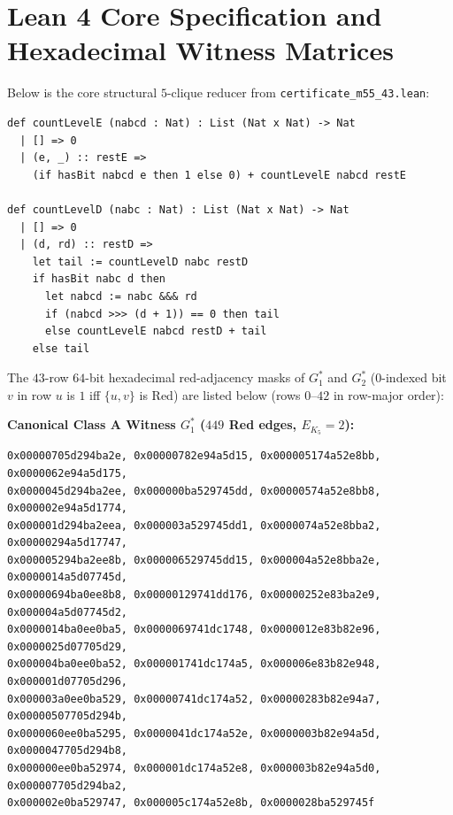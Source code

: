 \documentclass[11pt,a4paper]{article}
\theoremstyle{plain}
\theoremstyle{definition}
\begin{document}
\appendix
\section{Lean 4 Core Specification and Hexadecimal Witness Matrices}
\label{app:lean4}

Below is the core structural $5$-clique reducer from \texttt{certificate\_\allowbreak m55\_\allowbreak 43.lean}:
{\small
\begin{verbatim}
def countLevelE (nabcd : Nat) : List (Nat x Nat) -> Nat
  | [] => 0
  | (e, _) :: restE =>
    (if hasBit nabcd e then 1 else 0) + countLevelE nabcd restE

def countLevelD (nabc : Nat) : List (Nat x Nat) -> Nat
  | [] => 0
  | (d, rd) :: restD =>
    let tail := countLevelD nabc restD
    if hasBit nabc d then
      let nabcd := nabc &&& rd
      if (nabcd >>> (d + 1)) == 0 then tail
      else countLevelE nabcd restD + tail
    else tail
\end{verbatim}
}

The $43$-row $64$-bit hexadecimal red-adjacency masks of $G^*_1$ and $G^*_2$ ($0$-indexed bit $v$ in row $u$ is $1$ iff $\{u,v\}$ is Red) are listed below (rows $0$--$42$ in row-major order):

\medskip
\noindent\textbf{Canonical Class A Witness $G^*_1$ ($449$ Red edges, $E_{K_5} = 2$):}
{\footnotesize
\begin{verbatim}
0x00000705d294ba2e, 0x00000782e94a5d15, 0x000005174a52e8bb, 0x0000062e94a5d175,
0x0000045d294ba2ee, 0x000000ba529745dd, 0x00000574a52e8bb8, 0x000002e94a5d1774,
0x000001d294ba2eea, 0x000003a529745dd1, 0x0000074a52e8bba2, 0x00000294a5d17747,
0x000005294ba2ee8b, 0x000006529745dd15, 0x000004a52e8bba2e, 0x0000014a5d07745d,
0x00000694ba0ee8b8, 0x00000129741dd176, 0x00000252e83ba2e9, 0x000004a5d07745d2,
0x0000014ba0ee0ba5, 0x0000069741dc1748, 0x0000012e83b82e96, 0x0000025d07705d29,
0x000004ba0ee0ba52, 0x000001741dc174a5, 0x000006e83b82e948, 0x000001d07705d296,
0x000003a0ee0ba529, 0x00000741dc174a52, 0x00000283b82e94a7, 0x00000507705d294b,
0x0000060ee0ba5295, 0x0000041dc174a52e, 0x0000003b82e94a5d, 0x0000047705d294b8,
0x000000ee0ba52974, 0x000001dc174a52e8, 0x000003b82e94a5d0, 0x000007705d294ba2,
0x000002e0ba529747, 0x000005c174a52e8b, 0x0000028ba529745f
\end{verbatim}
}
\end{document}
